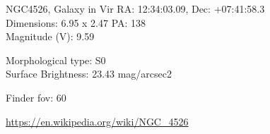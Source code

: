 \begin{block}{NGC4526, Galaxy in Vir}
    RA: 12:34:03.09, Dec: +07:41:58.3 \\ 
    Dimensions: 6.95 x 2.47 PA: 138 \\ 
    Magnitude (V): 9.59

    Morphological type: S0 \\ 
    Surface Brightness: 23.43 mag/arcsec2 


    Finder fov: 60 

    \url{https://en.wikipedia.org/wiki/NGC_4526} 
\end{block}